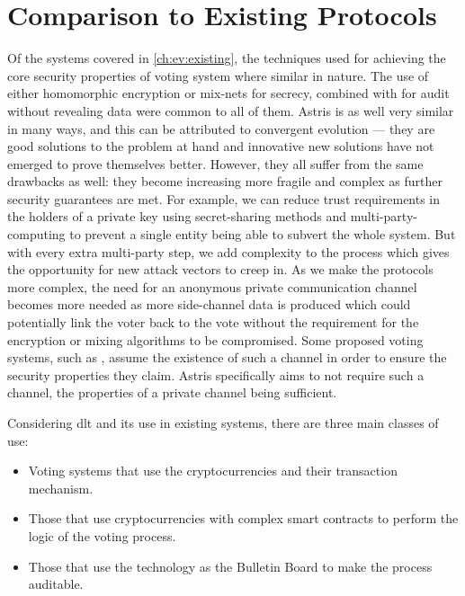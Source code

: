 \section{Comparison to Existing Protocols}
\label{ch:analysis:comparison}

Of the systems covered in \autoref{ch:ev:existing}, the techniques used for achieving the core security properties of voting system where similar in nature. The use of either homomorphic encryption or mix-nets for secrecy, combined with  for audit without revealing data were common to all of them. Astris is as well very similar in many ways, and this can be attributed to convergent evolution --- they are good solutions to the problem at hand and innovative new solutions have not emerged to prove themselves better. However, they all suffer from the same drawbacks as well: they become increasing more fragile and  complex as further security guarantees are met. For example, we can reduce trust requirements in the holders of a private key using secret-sharing methods and multi-party-computing to prevent a single entity being able to subvert the whole system. But with every extra multi-party step, we add complexity to the process which gives the opportunity for new attack vectors to creep in. As we make the protocols more complex, the need for an anonymous private communication channel becomes more needed as more side-channel data is produced which could potentially link the voter back to the vote without the requirement for the encryption or mixing algorithms to be compromised. Some proposed voting systems, such as \cite{liuEvotingProtocolBased2017}, assume the existence of such a channel in order to ensure the security properties they claim. Astris specifically aims to not require such a channel, the properties of a private channel being sufficient.

Considering \gls{dlt} and its use in existing systems, there are three main classes of use:

\begin{itemize}
    \item Voting systems that use the cryptocurrencies and their transaction mechanism.
    \item Those that use cryptocurrencies with complex smart contracts to perform the logic of the voting process.
    \item Those that use the technology as the Bulletin Board to make the process auditable.
\end{itemize}

